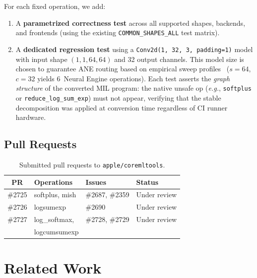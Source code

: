 \documentclass[10pt,twocolumn]{article}
\newcommand{\ane}{ANE}
\newcommand{\eg}{\textit{e.g.}}
\begin{document}
For each fixed operation, we add:
\begin{enumerate}[leftmargin=*,itemsep=1pt]
  \item A \textbf{parametrized correctness test} across all
    supported shapes, backends, and frontends (using the existing
    \texttt{COMMON\_SHAPES\_ALL} test matrix).

  \item A \textbf{dedicated regression test} using a
    \texttt{Conv2d(1,\,32,\,3,\,padding=1)} model with input shape
    $(1, 1, 64, 64)$ and 32 output channels.  This model size is
    chosen to guarantee \ane{} routing based on empirical sweep
    profiles~\citep{chinchangyang2026sweep} ($s{=}64$, $c{=}32$
    yields 6~Neural Engine operations).  Each test asserts the
    \emph{graph structure} of the converted MIL program: the native
    unsafe op (\eg{}, \texttt{softplus} or
    \texttt{reduce\_log\_sum\_exp}) must not appear, verifying that
    the stable decomposition was applied at conversion time
    regardless of CI runner hardware.
\end{enumerate}

\subsection{Pull Requests}

\begin{table}[h]
\centering
\caption{Submitted pull requests to \texttt{apple/coremltools}.}
\label{tab:prs}
\small
\begin{tabular}{@{}clll@{}}
\toprule
\textbf{PR} & \textbf{Operations} & \textbf{Issues} &
  \textbf{Status} \\
\midrule
\#2725 & softplus, mish    & \#2687, \#2359 & Under review \\
\#2726 & logsumexp         & \#2690         & Under review \\
\#2727 & log\_softmax,     & \#2728, \#2729 & Under review \\
       & logcumsumexp      &                & \\
\bottomrule
\end{tabular}
\end{table}


\section{Related Work}
\label{sec:related}
\end{document}
